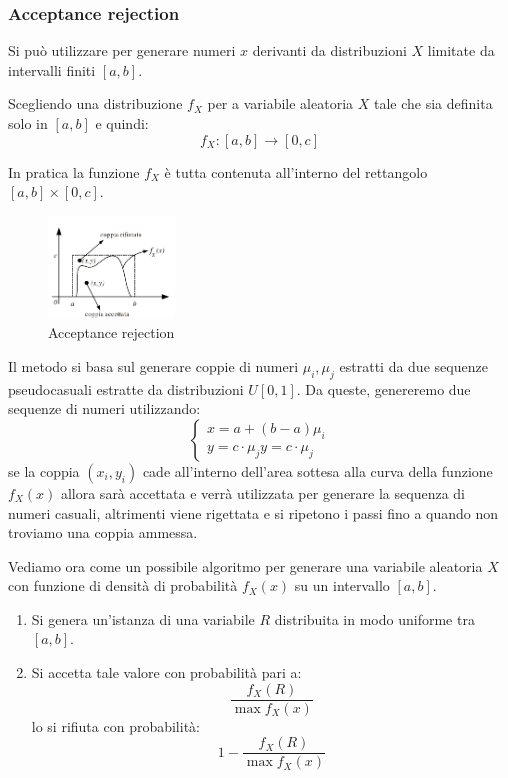 \subsubsection{Acceptance rejection}
Si può utilizzare per generare numeri $x$ derivanti da distribuzioni $X$ limitate
da intervalli finiti $[a,b]$.

Scegliendo una distribuzione $f_X$ per a variabile aleatoria $X$ tale che sia
definita solo in $[a,b]$ e quindi:
\begin{equation}
    f_X : [a,b] \rightarrow [0,c]
\end{equation}
\begin{osservazione}
    In pratica la funzione $f_X$ è tutta contenuta all'interno del rettangolo
    $[a,b] \times [0,c]$.
\end{osservazione}
\begin{figure}[!ht]
    \centering
    \includegraphics[width=0.3\textwidth]{./img/Reti/acceptancerejection.png}
    \caption{Acceptance rejection}
    \label{fig:acceptance-rejection}
\end{figure}
Il metodo si basa sul generare coppie di numeri $\mu_i,\mu_j$ estratti da due
sequenze pseudocasuali estratte da distribuzioni $U[0, 1]$. Da queste, genereremo
due sequenze di numeri utilizzando:
\begin{equation}
    \begin{cases}
        x = a + (b-a)\mu_i \\
        y = c \cdot \mu_j
        y = c \cdot \mu_j
    \end{cases}
\end{equation}
se la coppia $(x_i, y_i)$ cade all'interno dell'area sottesa alla curva della
funzione $f_X(x)$ allora sarà accettata e verrà utilizzata per generare la sequenza
di numeri casuali, altrimenti viene rigettata e si ripetono i passi fino a quando
non troviamo una coppia ammessa.

Vediamo ora come un possibile algoritmo per generare una variabile aleatoria $X$
con funzione di densità di probabilità $f_X(x)$ su un intervallo $[a,b]$.
\begin{enumerate}
    \item Si genera un'istanza di una variabile $R$ distribuita in modo uniforme
          tra $[a,b]$.
    \item Si accetta tale valore con probabilità pari a:
          \begin{equation*}
              \frac{f_X(R)}{\max f_X(x)}
          \end{equation*}
          lo si rifiuta con probabilità:
          \begin{equation*}
              1 - \frac{f_X(R)}{\max f_X(x)}
          \end{equation*}
\end{enumerate}


